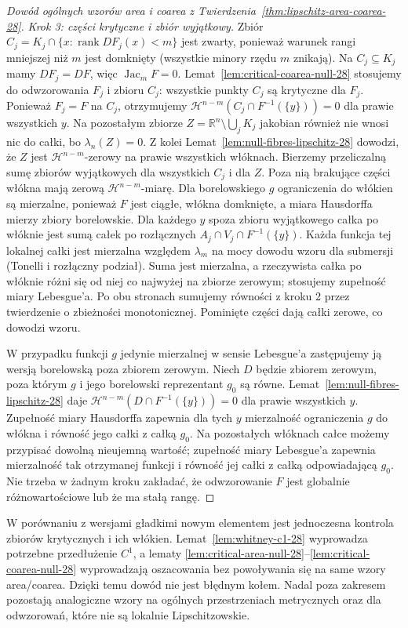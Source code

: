 \begin{proof}[Dowód ogólnych wzorów area i coarea z
Twierdzenia~\ref{thm:lipschitz-area-coarea-28}]
\emph{Krok 3: części krytyczne i zbiór wyjątkowy.}
Zbiór
$C_j=K_j\cap\{x:\operatorname{rank}DF_j(x)<m\}$
jest zwarty, ponieważ warunek rangi mniejszej niż $m$
jest domknięty (wszystkie minory rzędu $m$ znikają).
Na $C_j\subseteq K_j$ mamy $DF_j=DF$, więc
$\operatorname{Jac}_mF=0$. Lemat~\ref{lem:critical-coarea-null-28}
stosujemy do odwzorowania $F_j$ i zbioru $C_j$:
wszystkie punkty $C_j$ są krytyczne dla $F_j$.
Ponieważ $F_j=F$ na $C_j$, otrzymujemy
$\mathcal H^{n-m}(C_j\cap F^{-1}(\{y\}))=0$
dla prawie wszystkich $y$. Na pozostałym zbiorze
$Z=\mathbb R^n\setminus\bigcup_jK_j$ jakobian
również nie wnosi nic do całki, bo
$\lambda_n(Z)=0$. Z kolei
Lemat~\ref{lem:null-fibres-lipschitz-28} dowodzi,
że $Z$ jest $\mathcal H^{n-m}$-zerowy na
prawie wszystkich włóknach. Bierzemy przeliczalną sumę zbiorów wyjątkowych
dla wszystkich $C_j$ i dla $Z$. Poza nią brakujące
części włókna mają zerową $\mathcal H^{n-m}$-miarę.
Dla borelowskiego $g$ ograniczenia do włókien są
mierzalne, ponieważ $F$ jest ciągłe, włókna domknięte,
a miara Hausdorffa mierzy zbiory borelowskie.
Dla każdego $y$ spoza zbioru wyjątkowego
całka po włóknie jest sumą całek po rozłącznych
$A_j\cap V_j\cap F^{-1}(\{y\})$.
Każda funkcja tej lokalnej całki jest mierzalna
względem $\lambda_m$ na mocy dowodu wzoru
dla submersji (Tonelli i rozłączny podział).
Suma jest mierzalna, a rzeczywista całka po włóknie
różni się od niej co najwyżej na zbiorze zerowym;
stosujemy zupełność miary Lebesgue'a.
Po obu stronach sumujemy równości z kroku 2
przez twierdzenie o zbieżności monotonicznej.
Pominięte części dają całki zerowe, co dowodzi wzoru.

W przypadku funkcji $g$ jedynie mierzalnej
w sensie Lebesgue'a zastępujemy ją wersją
borelowską poza zbiorem zerowym. Niech $D$ będzie zbiorem zerowym, poza którym
$g$ i jego borelowski reprezentant $g_0$ są równe.
Lemat~\ref{lem:null-fibres-lipschitz-28} daje
$\mathcal H^{n-m}(D\cap F^{-1}(\{y\}))=0$
dla prawie wszystkich $y$. Zupełność miary Hausdorffa
zapewnia dla tych $y$ mierzalność ograniczenia $g$
do włókna i równość jego całki z całką $g_0$.
Na pozostałych włóknach całce możemy przypisać
dowolną nieujemną wartość; zupełność miary Lebesgue'a
zapewnia mierzalność tak otrzymanej funkcji i równość
jej całki z całką odpowiadającą $g_0$.
Nie trzeba w żadnym kroku zakładać, że odwzorowanie
$F$ jest globalnie różnowartościowe lub że ma
stałą rangę.
\end{proof}

\begin{uwaga}
W porównaniu z wersjami gładkimi nowym elementem
jest jednoczesna kontrola zbiorów krytycznych i ich
włókien. Lemat~\ref{lem:whitney-c1-28} wyprowadza
potrzebne przedłużenie $C^1$, a lematy
\ref{lem:critical-area-null-28}--\ref{lem:critical-coarea-null-28}
wyprowadzają oszacowania bez powoływania się na
same wzory area/coarea. Dzięki temu dowód nie jest
błędnym kołem. Nadal poza zakresem pozostają
analogiczne wzory na ogólnych przestrzeniach
metrycznych oraz dla odwzorowań, które nie są
lokalnie Lipschitzowskie.
\end{uwaga}

